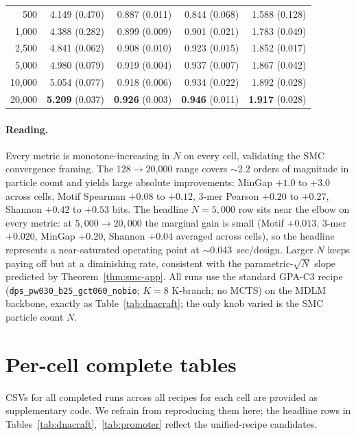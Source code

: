 \begin{table}[h]
\begin{tabular}{rrrrr}
   500 & 4.149 (0.470) & 0.887 (0.011) & 0.844 (0.068) & 1.588 (0.128) \\
 1{,}000 & 4.388 (0.282) & 0.899 (0.009) & 0.901 (0.021) & 1.783 (0.049) \\
 2{,}500 & 4.841 (0.062) & 0.908 (0.010) & 0.923 (0.015) & 1.852 (0.017) \\
 5{,}000 & 4.980 (0.079) & 0.919 (0.004) & 0.937 (0.007) & 1.867 (0.042) \\
10{,}000 & 5.054 (0.077) & 0.918 (0.006) & 0.934 (0.022) & 1.892 (0.028) \\
20{,}000 & \textbf{5.209} (0.037) & \textbf{0.926} (0.003) & \textbf{0.946} (0.011) & \textbf{1.917} (0.028) \\
\bottomrule
\end{tabular}
\end{table}

\paragraph{Reading.}
Every metric is monotone-increasing in $N$ on every cell, validating the SMC convergence framing. The 128$\to$20{,}000 range covers $\sim$2.2 orders of magnitude in particle count and yields large absolute improvements: MinGap $+1.0$ to $+3.0$ across cells, Motif Spearman $+0.08$ to $+0.12$, 3-mer Pearson $+0.20$ to $+0.27$, Shannon $+0.42$ to $+0.53$ bits. The headline $N\!=\!5{,}000$ row sits near the elbow on every metric: at $5{,}000\!\to\!20{,}000$ the marginal gain is small (Motif $+0.013$, 3-mer $+0.020$, MinGap $+0.20$, Shannon $+0.04$ averaged across cells), so the headline represents a near-saturated operating point at $\sim$0.043~sec/design. Larger $N$ keeps paying off but at a diminishing rate, consistent with the parametric-$\sqrt{N}$ slope predicted by Theorem~\ref{thm:smc-app}. All runs use the standard GPA-C3 recipe (\texttt{dps\_pw030\_b25\_gct060\_nobio}; $K\!=\!8$ K-branch; no MCTS) on the MDLM backbone, exactly as Table~\ref{tab:dnacraft}; the only knob varied is the SMC particle count $N$.

\section{Per-cell complete tables}\label{app:full_tables}

CSVs for all completed runs across all recipes for each cell are provided as supplementary code. We refrain from reproducing them here; the headline rows in Tables~\ref{tab:dnacraft},~\ref{tab:promoter} reflect the unified-recipe candidates.
